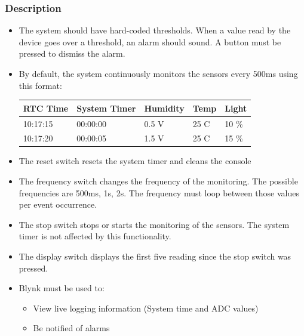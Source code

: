 \subsubsection{Description}
\label{sec:ProjDescription}
\begin{itemize}
    \item The system should have hard-coded thresholds. When a value read by the device goes over a threshold, an alarm should sound. A button must be pressed to dismiss the alarm.
    \item By default, the system continuously monitors the sensors every 500ms using this format:
    \begin{table}[H]
    \centering
    \begin{tabular}{|l|l|l|l|l|}
    \hline
    RTC Time & System Timer & Humidity  & Temp  & Light \\ \hline
    10:17:15 & 00:00:00     & 0.5 V &   25 C    & 10 \% \\ \hline
    10:17:20 & 00:00:05     & 1.5 V &   25 C    & 15 \% \\ \hline
    \end{tabular}
    \end{table}
    \item The reset switch resets the system timer and cleans the console
    \item The frequency switch changes the frequency of the monitoring. The possible frequencies are 500ms, 1s, 2s. The frequency must loop between those values per event occurrence.
    \item The stop switch stops or starts the monitoring of the sensors. The system timer is not affected by this functionality.
    \item The display switch displays the first five reading since the stop switch was pressed.
    \item Blynk must be used to:
    \begin{itemize}
        \item View live logging information (System time and ADC values)
        \item Be notified of alarms
    \end{itemize}
\end{itemize}

